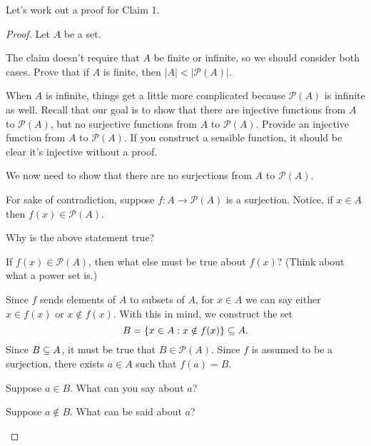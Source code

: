 \noindent Let's work out a proof for Claim 1.
\begin{mdframed}[backgroundcolor=gray!10!]
\begin{proof}
Let $A$ be a set.\\
\begin{mdframed}[backgroundcolor=white]
\begin{question}[resume]
\item The claim doesn't require that $A$ be finite or infinite, so we should consider both cases.  Prove that if $A$ is finite, then $|A|<|\mathscr{P}(A)|$.
\vspace{2in}

\item When $A$ is infinite, things get a little more complicated because $\mathscr{P}(A)$ is infinite as well.  Recall that our goal is to show that there are injective functions from $A$ to $\mathscr{P}(A)$, but no surjective functions from $A$ to $\mathscr{P}(A)$.  Provide an injective function from $A$ to $\mathscr{P}(A)$.  If you construct a sensible function, it should be clear it's injective without a proof.
\vspace{2in}

\item We now need to show that there are no surjections from $A$ to $\mathscr{P}(A)$.
\end{question}
\end{mdframed}
For sake of contradiction, suppose $f: A \to \mathscr{P}(A)$ is a surjection.  Notice, if $x \in A$ then $f(x) \in \mathscr{P}(A)$.\\
\begin{mdframed}[backgroundcolor=white]
\begin{question}[start=5]
\item Why is the above statement true?
\vspace{.5in}
\item If $f(x) \in \mathscr{P}(A)$, then what else must be true about $f(x)$?  (Think about what a power set is.)
\vspace{.5in}
\end{question}
\end{mdframed}
\noindent Since $f$ sends elements of $A$ to subsets of $A$, for $x \in A$ we can say either $x \in f(x)$ or $x\notin f(x)$.  With this in mind, we construct the set
\[B = \left\{x \in A : x \notin f(x)\right\} \subseteq A.\]
Since $B \subseteq A$, it must be true that $B \in \mathscr{P}(A)$.  Since $f$ is assumed to be a surjection, there exists $a \in A$ such that $f(a) = B$.\\
\begin{mdframed}[backgroundcolor=white]
\begin{question}[start=7]
\item Suppose $a \in B$.  What can you say about $a$?

\vspace{3in}
\item Suppose $a \notin B$.  What can be said about $a$?

\vspace{3in}
\end{question}
\end{mdframed}
\end{proof}
\end{mdframed}
